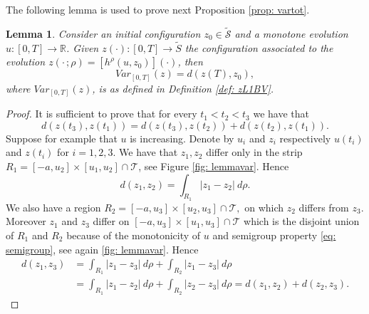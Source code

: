 \documentclass[12pt]{article}
\newcommand{\R}{\mathbb{R}}
\newcommand{\T}{\mathcal{T}}
\newcommand{\p}{\rho}
\newcommand{\1}{\mathds{1}}
\newtheorem{lem}[teo]{Lemma}
\theoremstyle{definition}
\begin{document}
The following lemma is used to prove next Proposition \ref{prop: vartot}.
\begin{lem}\label{lemma: zvar1}
    Consider an initial configuration $z_0\in \tilde{\mathcal S}$ and a monotone evolution $u : [0,T]\to \R$. Given $z(\cdot):[0,T]\to \tilde S$ the configuration associated to the evolution $z(\cdot\,;\p)=[h^\p(u,z_0)](\cdot)$, then \begin{equation}
        {Var}_{[0,T]}(z) = d(z(T),z_0),
    \end{equation} where ${Var}_{[0,T]}(z)$, is as defined in Definition \ref{def: zL1BV}.
\end{lem}
\begin{proof}
    It is sufficient to prove that for every $t_1<t_2<t_3$ we have that \[d(z(t_3),z(t_1))=d(z(t_3),z(t_2))+d(z(t_2),z(t_1)).\] Suppose for example that $u$ is increasing. Denote by $u_i$ and $z_i$ respectively $u(t_i)$ and $z(t_i)$ for $i=1,2,3.$ We have that $z_1,z_2$ differ only in the strip $R_1=[-a,u_2]\times [u_1,u_2] \cap \T$, see Figure \ref{fig: lemmavar}. Hence \[d(z_1,z_2)=\int_{R_1} |z_1-z_2| ~d\p.\] We also have a region $R_2=[-a,u_3]\times[u_2,u_3] \cap \T,$ on which $z_2$ differs from $z_3$. Moreover $z_1$ and $z_3$ differ on $[-a,u_3]\times[u_1,u_3]\cap \T $ which is the disjoint union of $R_1$ and $R_2$ because of the monotonicity of $u$ and semigroup property \eqref{eq: semigroup}, see again \ref{fig: lemmavar}. Hence \[\begin{split} d(z_1,z_3)&=\int_{R_1} |z_1-z_3| ~d\p + \int_{R_2} |z_1-z_3| ~d\p \\&= \int_{R_1} |z_1-z_2| ~d\p + \int_{R_2} |z_2-z_3| ~d\p=d(z_1,z_2)+d(z_2,z_3).\end{split}\] 
\end{proof}
\end{document}
